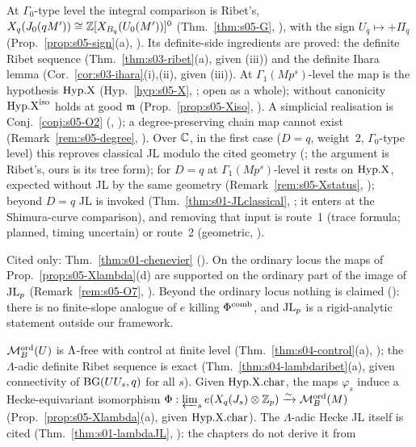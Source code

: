 \begin{description}[leftmargin=0pt,itemsep=3pt]
\item[(a) Base change to $\C$.] At $\Gamma_0$-type level the integral comparison is Ribet's,
  $X_q(J_0(qM'))\cong\mathbb{Z}[X_{B_q}(U_0(M'))]^0$ (Thm.~\ref{thm:s05-G}, \stcited), with the sign $U_q\mapsto+\Pi_q$
  (Prop.~\ref{prop:s05-sign}(a), \stpmc). Its definite-side ingredients are proved: the definite Ribet sequence
  (Thm.~\ref{thm:s03-ribet}(a), \stproved{} given (iii)) and the definite Ihara lemma (Cor.~\ref{cor:s03-ihara}(i),(ii),
  \stproved{} given (iii)). At $\Gamma_1(Mp^s)$-level the map is the hypothesis $\mathrm{Hyp.X}$ (Hyp.~\ref{hyp:s05-X}, \sthyp; open as
  a whole); without canonicity $\mathrm{Hyp.X}^{\mathrm{iso}}$ holds at good $\mathfrak{m}$ (Prop.~\ref{prop:s05-Xiso}, \stpmc). A simplicial realisation is
  Conj.~\ref{conj:s05-O2} (\stconj, \stopen); a degree-preserving chain map cannot exist (Remark~\ref{rem:s05-degree}, \stsketch).
  Over $\C$, in the first case ($D=q$, weight~$2$, $\Gamma_0$-type level) this reproves classical JL modulo the cited
  geometry (; the argument is Ribet's, ours is its tree form); for $D=q$ at $\Gamma_1(Mp^s)$-level it rests on $\mathrm{Hyp.X}$,
  expected without JL by the same geometry (Remark~\ref{rem:s05-Xstatus}, \stexp); beyond $D=q$ JL is invoked
  (Thm.~\ref{thm:s01-JLclassical}, \stcited; it enters at the Shimura-curve comparison), and removing that input is route~1 (trace
  formula; planned, timing uncertain) or route~2
  (geometric, \stopen).
\item[(b) Chenevier's $p$-adic JL.] Cited only: Thm.~\ref{thm:s01-chenevier} (\stcited). On the ordinary locus the maps of
  Prop.~\ref{prop:s05-Xlambda}(d) are supported on the ordinary part of the image of $\mathrm{JL}_p$ (Remark~\ref{rem:s05-O7},
  \stsketch). Beyond the ordinary locus nothing is claimed (\stopen): there is
  no finite-slope analogue of $e$ killing $\Phi^{\mathrm{comb}}$, and $\mathrm{JL}_p$ is a rigid-analytic statement outside our framework.
\item[(c) $\Lambda$-adic JL.] $\mathcal{M}^{\mathrm{ord}}_B(U)$ is $\Lambda$-free with control at finite level (Thm.~\ref{thm:s04-control}(a),
  \stproved); the $\Lambda$-adic definite Ribet sequence is exact (Thm.~\ref{thm:s04-lambdaribet}(a), \stproved{} given
  connectivity of $\mathrm{BG}(UU_s,q)$ for all $s$). Given $\mathrm{Hyp.X.char}$, the maps $\varphi_s$ induce a Hecke-equivariant isomorphism
  $\Phi:\varprojlim_se(X_q(J_s)\otimes\mathbb{Z}_p)\xrightarrow\sim\mathcal{M}^{\mathrm{ord}}_B(M)$ (Prop.~\ref{prop:s05-Xlambda}(a), \stproved{} given
  $\mathrm{Hyp.X.char}$). The $\Lambda$-adic Hecke JL itself is cited (Thm.~\ref{thm:s01-lambdaJL}, \stcited): the chapters do not derive it from

\end{description}
